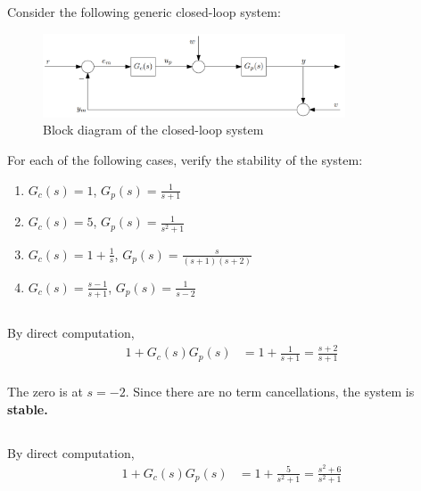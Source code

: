 \section{}
Consider the following generic closed-loop system:
\begin{figure}[h]
    \centering
    \includegraphics[width=0.8\textwidth]{Questions/Figures/Q4ProblemDiagram.png}
    \caption{Block diagram of the closed-loop system}
    \label{fig:Q4ProblemDiagram}
\end{figure}


For each of the following cases, verify the stability of the system:
\begin{enumerate}[label=(\alph*)]
    \item $G_c(s) = 1$, $G_p(s) = \frac{1}{s+1}$
    \item $G_c(s) = 5$, $G_p(s) = \frac{1}{s^2+1}$
    \item $G_c(s) = 1 + \frac{1}{s}$, $G_p(s) = \frac{s}{(s+1)(s+2)}$
    \item $G_c(s) = \frac{s-1}{s+1}$, $G_p(s) = \frac{1}{s-2}$
\end{enumerate}

\subsection{}
By direct computation,
\begin{align*}
    1 + G_c(s)G_p(s) &= 1 + \frac{1}{s+1} = \frac{s+2}{s+1} \\
\end{align*}

The zero is at $s = -2$. Since there are no term cancellations, the system is \textbf{stable.}

\subsection{}
By direct computation,
\begin{align*}
    1 + G_c(s)G_p(s) &= 1 + \frac{5}{s^2+1} = \frac{s^2+6}{s^2+1} \\
\end{align*}

